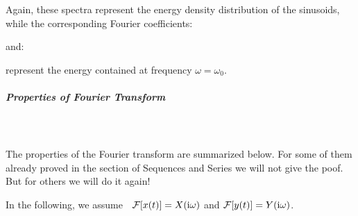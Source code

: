 	\begin{tcolorbox}[colframe=black,colback=white,sharp corners]
	Again, these spectra represent the energy density distribution of the sinusoids, while the corresponding Fourier coefficients:
	
	and:
	
	represent the energy contained at frequency $\omega=\omega_0$.
	\end{tcolorbox}
	
	
	
	
	\subparagraph{Properties of Fourier Transform}\mbox{}\\\\	
	The properties of the Fourier transform are summarized below. For some of them already proved in the section of Sequences and Series we will not give the poof. But for others we will do it again! 
	
	In the following, we assume 
	$\;\;{\cal F}[x(t)]=X(\mathrm{i}\omega)$ and ${\cal F}[y(t)]=Y(\mathrm{i}\omega)$.
	
